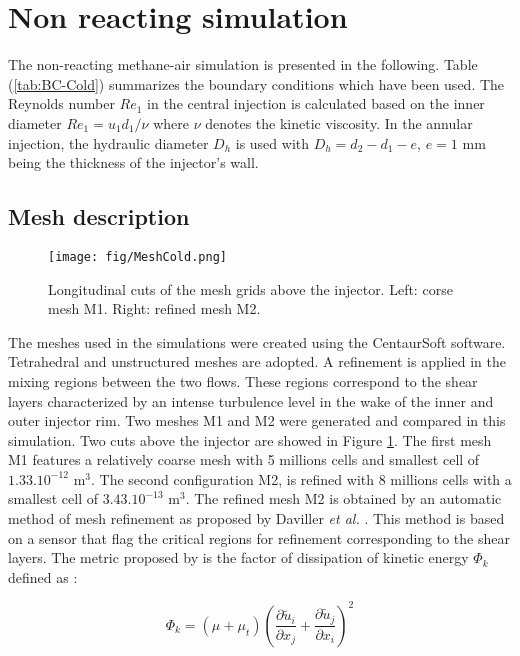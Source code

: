 \documentclass[twocolumn,10pt]{asme2e}
\begin{document}
\section*{Non reacting simulation}

The non-reacting methane-air simulation is presented in the following. Table (\ref{tab:BC-Cold}) summarizes the boundary conditions which have been used. The Reynolds number $Re_1$ in the central injection is calculated based on the inner diameter $Re_1 = u_1 d_1/\nu$ where $\nu$ denotes the kinetic viscosity. In the annular injection, the hydraulic diameter $D_h$ is used with $D_h = d_2 - d_1 -e$, $e=1$ mm being the thickness of the injector's wall. 

\subsection*{Mesh description}

\begin{figure}[b]
  \centering
  \texttt{[image: fig/MeshCold.png]}
  \caption{ Longitudinal cuts of the mesh grids above the injector. Left: corse mesh M1. Right: refined mesh M2. }
  \label{fig:MeshCold}
\end{figure}

The meshes used in the simulations were created using the CentaurSoft software. Tetrahedral and unstructured meshes are adopted. A refinement is applied in the mixing regions between the two flows. These regions correspond to the shear layers characterized by an intense turbulence level in the wake of the inner and outer injector rim. Two meshes M1 and M2 were generated and compared in this simulation. Two cuts above the injector are showed in Figure \ref{fig:MeshCold}. The first mesh M1 features a relatively coarse mesh with 5 millions cells and smallest cell of $1.33.10^{-12}$  m$^3$. The second configuration M2, is refined with 8 millions cells with a smallest cell of $3.43.10^{-13}$ m$^3$. The refined mesh M2 is obtained by an automatic method of mesh refinement as proposed by Daviller \textit{et al.} \cite{daviller2017mesh}. This method is based on a sensor that flag the critical regions for refinement corresponding to the shear layers. The metric proposed by \cite{daviller2017mesh} is the factor of dissipation of kinetic energy $\Phi_k$ defined as :


\begin{equation}
\label{eq:LIKE}
\Phi_k = (\mu + \mu_t) (\frac{\partial \tilde{u}_i }{\partial x_j} + \frac{\partial \tilde{u}_j }{\partial x_i} )^2 
\end{equation}
\end{document}
